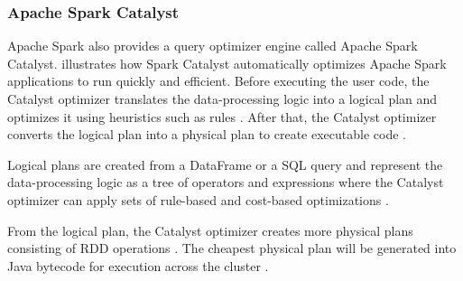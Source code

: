 \subsubsection{Apache Spark Catalyst}
\label{subsubsec:04_spark_pr-model_catalyst}
Apache Spark also provides a query optimizer engine called Apache Spark Catalyst.  illustrates how Spark Catalyst automatically optimizes Apache Spark applications to run quickly and efficient.
Before executing the user code, the Catalyst optimizer translates the data-processing logic into a logical plan and optimizes it using heuristics such as rules \cite{Hien2018Spark}. After that, the Catalyst optimizer converts the logical plan into a physical plan to create executable code \cite{Hien2018Spark}.


Logical plans are created from a DataFrame or a SQL query and represent the data-processing logic as a tree of operators and expressions where the Catalyst optimizer can apply sets of rule-based and cost-based optimizations \cite{Hien2018Spark}.

From the logical plan, the Catalyst optimizer creates more physical plans consisting of RDD operations \cite{Chambers2018Spark}. The cheapest physical plan will be generated into Java bytecode for execution across the cluster \cite{Hien2018Spark}.

